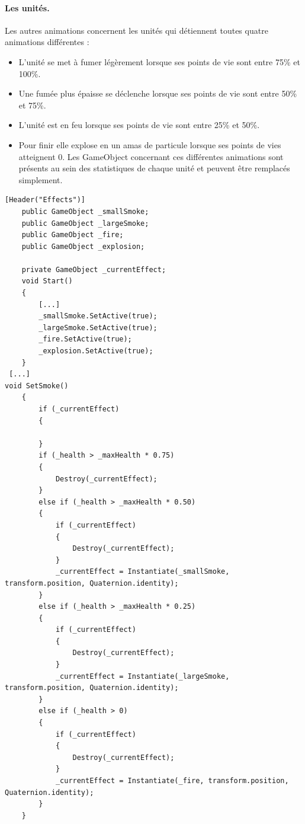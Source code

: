\documentclass{report}
\begin{document}
\paragraph{Les unités.}
Les autres animations concernent les unités qui détiennent toutes quatre animations différentes :
\begin{itemize}
\item L'unité se met à fumer légèrement lorsque ses points de vie sont entre 75\% et 100\%.
\item Une fumée plus épaisse se déclenche lorsque ses points de vie sont entre 50\% et 75\%.
\item L'unité est en feu lorsque ses points de vie sont entre 25\% et 50\%.
\item Pour finir elle explose en un amas de particule lorsque ses points de vies atteignent 0.
Les GameObject concernant ces différentes animations sont présents au sein des statistiques de chaque unité et peuvent être remplacés simplement.
\end{itemize}
 \begin{lstlisting}[language={[Sharp]C},label={lst:statsAnimation}, caption= Extrait du code de Stats.cs]
    [Header("Effects")]
    public GameObject _smallSmoke;
    public GameObject _largeSmoke;
    public GameObject _fire;
    public GameObject _explosion;

    private GameObject _currentEffect;
    void Start()
    {
        [...]
        _smallSmoke.SetActive(true);
        _largeSmoke.SetActive(true);
        _fire.SetActive(true);
        _explosion.SetActive(true);
    }
 [...]
void SetSmoke()
    {
        if (_currentEffect)
        {
            
        }
        if (_health > _maxHealth * 0.75)
        {
            Destroy(_currentEffect);
        }
        else if (_health > _maxHealth * 0.50)
        {
            if (_currentEffect)
            {
                Destroy(_currentEffect);
            }
            _currentEffect = Instantiate(_smallSmoke, transform.position, Quaternion.identity);
        }
        else if (_health > _maxHealth * 0.25)
        {
            if (_currentEffect)
            {
                Destroy(_currentEffect);
            }
            _currentEffect = Instantiate(_largeSmoke, transform.position, Quaternion.identity);
        }
        else if (_health > 0)
        {
            if (_currentEffect)
            {
                Destroy(_currentEffect);
            }
            _currentEffect = Instantiate(_fire, transform.position, Quaternion.identity);
        }
    }
\end{lstlisting}
\end{document}
